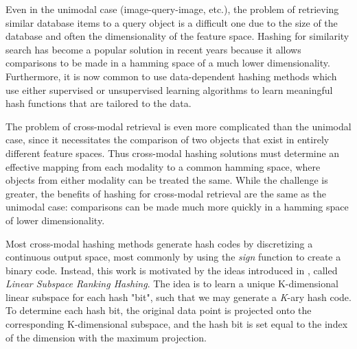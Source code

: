 \documentclass[letterpaper]{article}
\begin{document}
Even in the unimodal case (image-query-image, etc.), the problem of retrieving similar database items to a query object is a difficult one due to the size of the database and often the dimensionality of the feature space. Hashing for similarity search has become a popular solution in recent years because it allows comparisons to be made in a hamming space of a much lower dimensionality. Furthermore, it is now common to use data-dependent hashing methods which use either supervised or unsupervised learning algorithms to learn meaningful hash functions that are tailored to the data.

\begin{comment}
The K-nearest neighbors (kNN) problem is the classic problem of retrieving the $ k $ database items that are most similar to the query. In many cases, only an approximation to kNN can be given, which is often a good enough solution. Another approach to this problem, hashing for similarity search, has become popular in recent years, beginning with the introduction of Locality Sensitive Hashing (LSH) \cite{lsh}. Initially, LSH methods relied on choosing random hyperplanes to separate the data points, where each hyperplane accounts for one hash bit and the hash bit is determined according to which side of the hyperplane the data point belongs. The main benefit of hashing for similarity is that the curse of dimensionality can be avoided: rather than making costly comparisons among all of the (often continuous-valued) features in the original feature space, examples can be compared in hamming space of a much lower dimensionality. While random LSH methods are called \emph{data-independent} hash methods, recent works have focused on \emph{data-dependent} hash methods which must be learned using either supervised or unsupervised learning algorithms.
\end{comment}

The problem of cross-modal retrieval is even more complicated than the unimodal case, since it necessitates the comparison of two objects that exist in entirely different feature spaces. Thus cross-modal hashing solutions must determine an effective mapping from each modality to a common hamming space, where objects from either modality can be treated the same. While the challenge is greater, the benefits of hashing for cross-modal retrieval are the same as the unimodal case: comparisons can be made much more quickly in a hamming space of lower dimensionality.

Most cross-modal hashing methods generate hash codes by discretizing a continuous output space, most commonly by using the \emph{sign} function to create a binary code. Instead, this work is motivated by the ideas introduced in \cite{kai}, called \emph{Linear Subspace Ranking Hashing}. The idea is to learn a unique K-dimensional linear subspace for each hash "bit", such that we may generate a \emph{K}-ary hash code. To determine each hash bit, the original data point is projected onto the corresponding K-dimensional subspace, and the hash bit is set equal to the index of the dimension with the maximum projection.
\end{document}

